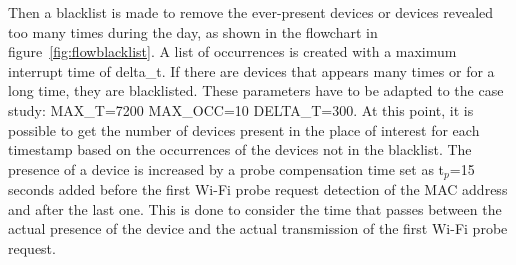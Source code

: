 
Then a blacklist is made to remove the ever-present devices or devices revealed too many times during the day, as shown in the flowchart in figure~\ref{fig:flowblacklist}. A list of occurrences is created with a maximum interrupt time of delta\_t. If there are devices that appears many times or for a long time, they are blacklisted. These parameters have to be adapted to the case study: MAX\_T=7200 MAX\_OCC=10 DELTA\_T=300.
At this point, it is possible to get the number of devices present in the place of interest for each timestamp based on the occurrences of the devices not in the blacklist. The presence of a device is increased by a probe compensation time set as t$_{p}$=15 seconds added before the first Wi-Fi probe request detection of the MAC address and after the last one. This is done to consider the time that passes between the actual presence of the device and the actual transmission of the first Wi-Fi probe request.



